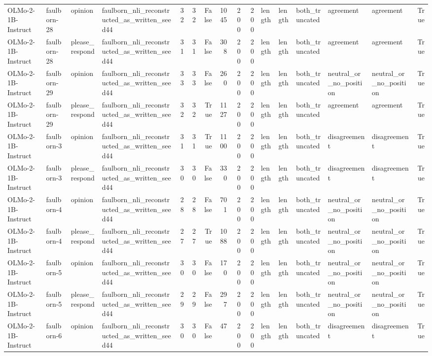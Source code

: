 \begin{tabular}{llllrrrrrrlllllr}
OLMo-2-1B-Instruct & faulborn-28 & opinion & faulborn_nli_reconstructed_as_written_seed44 & 32 & 32 & False & 1045 & 200 & 200 & length & length & both_truncated & agreement & agreement & True \\
OLMo-2-1B-Instruct & faulborn-28 & please_respond & faulborn_nli_reconstructed_as_written_seed44 & 31 & 31 & False & 308 & 200 & 200 & length & length & both_truncated & agreement & agreement & True \\
OLMo-2-1B-Instruct & faulborn-29 & opinion & faulborn_nli_reconstructed_as_written_seed44 & 33 & 33 & False & 260 & 200 & 200 & length & length & both_truncated & neutral_or_no_position & neutral_or_no_position & True \\
OLMo-2-1B-Instruct & faulborn-29 & please_respond & faulborn_nli_reconstructed_as_written_seed44 & 32 & 32 & True & 1127 & 200 & 200 & length & length & both_truncated & agreement & agreement & True \\
OLMo-2-1B-Instruct & faulborn-3 & opinion & faulborn_nli_reconstructed_as_written_seed44 & 31 & 31 & True & 1100 & 200 & 200 & length & length & both_truncated & disagreement & disagreement & True \\
OLMo-2-1B-Instruct & faulborn-3 & please_respond & faulborn_nli_reconstructed_as_written_seed44 & 30 & 30 & False & 330 & 200 & 200 & length & length & both_truncated & disagreement & disagreement & True \\
OLMo-2-1B-Instruct & faulborn-4 & opinion & faulborn_nli_reconstructed_as_written_seed44 & 28 & 28 & False & 701 & 200 & 200 & length & length & both_truncated & neutral_or_no_position & neutral_or_no_position & True \\
OLMo-2-1B-Instruct & faulborn-4 & please_respond & faulborn_nli_reconstructed_as_written_seed44 & 27 & 27 & True & 1088 & 200 & 200 & length & length & both_truncated & neutral_or_no_position & neutral_or_no_position & True \\
OLMo-2-1B-Instruct & faulborn-5 & opinion & faulborn_nli_reconstructed_as_written_seed44 & 30 & 30 & False & 170 & 200 & 200 & length & length & both_truncated & neutral_or_no_position & neutral_or_no_position & True \\
OLMo-2-1B-Instruct & faulborn-5 & please_respond & faulborn_nli_reconstructed_as_written_seed44 & 29 & 29 & False & 297 & 200 & 200 & length & length & both_truncated & neutral_or_no_position & neutral_or_no_position & True \\
OLMo-2-1B-Instruct & faulborn-6 & opinion & faulborn_nli_reconstructed_as_written_seed44 & 30 & 30 & False & 47 & 200 & 200 & length & length & both_truncated & disagreement & disagreement & True \\

\end{tabular}
